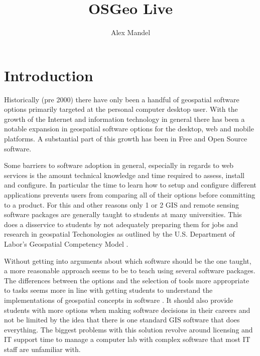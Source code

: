 \documentclass[12pt,letterpaper]{article}
\title{OSGeo Live}
\author{Alex Mandel}
\begin{document}
\maketitle
\tableofcontents

\section{Introduction}
	Historically (pre 2000) there have only been a handful of geospatial software options primarily targeted at the personal computer desktop user. With the growth of the Internet and information technology in general there has been a notable expansion in geospatial software options for the desktop, web and mobile platforms. A substantial part of this growth has been in Free and Open Source software.

	Some barriers to software adoption in general, especially in regards to web services is the amount technical knowledge and time required to assess, install and configure. In particular the time to learn how to setup and configure different applications prevents users from comparing all of their options before committing to a product. For this and other reasons only 1 or 2 GIS and remote sensing software packages are generally taught to students at many universities. This does a disservice to students by not adequately preparing them for jobs and research in geospatial Techonologies as outlined by the U.S. Department of Labor's Geospatial Competency Model \parencite{DepartmentofLabor2011}.
	
	Without getting into arguments about which software should be the one taught, a more reasonable approach seems to be to teach using several software packages. The differences between the options and the selection of tools more appropriate to tasks seems more in line with getting students to understand the implementations of geospatial concepts in software \parencite{Cammack2005}. It should also provide students with more options when making software decisions in their careers and not be limited by the idea that there is one standard GIS software that does everything. The biggest problems with this solution revolve around licensing and IT support time to manage a computer lab with complex software that most IT staff are unfamiliar with. 
	
\end{document}
